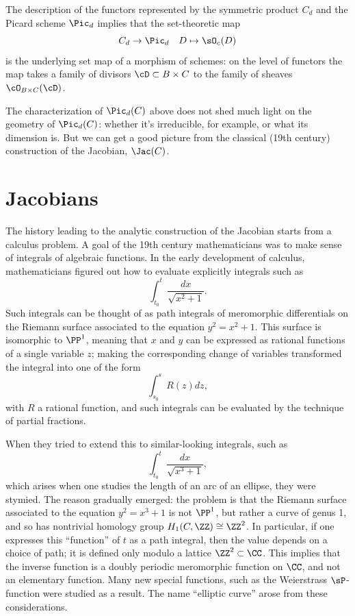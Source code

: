 The description of the functors represented by the symmetric product $C_d$ and the Picard scheme $\Pic_d$ implies that the 
set-theoretic map
$$
C_d \to \Pic_d \quad D \mapsto \sO_c(D)
$$
is the underlying set map of a morphism of schemes: on the level of functors the map takes a family of divisors $\cD\subset B\times C$
to the family of sheaves $\cO_{B\times C}(\cD)$.

The characterization of $\Pic_d(C)$ above does not shed much light on the geometry of $\Pic_d(C)$: whether it's irreducible, for example, or what its dimension is. But we can get a  good picture from the classical (19th century) construction of the Jacobian, $\Jac(C)$.
 
\section{Jacobians}

The history leading to the analytic construction of the Jacobian starts from a calculus problem. A goal of the 19th century mathematicians was  to make sense of integrals of algebraic functions. In the early development of calculus, mathematicians figured out how to evaluate explicitly integrals such as
$$
\int_{t_0}^t \frac{dx}{\sqrt{x^2+1}}.
$$
Such integrals can be thought of as path integrals of meromorphic differentials on the Riemann surface associated to the equation $y^2 = x^2+1$. This surface is isomorphic to $\PP^1$, meaning that $x$ and $y$ can be expressed as rational functions of a single variable $z$; making the corresponding change of variables transformed the integral into one of the form
$$
\int_{s_0}^s R(z)dz,
$$
with $R$ a rational function, and such integrals can be evaluated by the technique of partial fractions.

When they tried to extend this to similar-looking integrals, such as
$$
\int_{t_0}^t \frac{dx}{\sqrt{x^3+1}},
$$
which arises when one studies the length of an arc of an ellipse, they were stymied. The reason gradually emerged: the problem is that the Riemann surface associated to the equation $y^2 = x^3+1$ is not $\PP^1$, but rather a curve of genus 1, and so has nontrivial homology group $H_1(C, \ZZ) \cong \ZZ^2$. In particular, if one expresses this ``function'' of $t$  as a path integral, then the value depends on a choice of path; it is defined only modulo a lattice $\ZZ^2 \subset \CC$. This implies that the inverse function is a doubly periodic meromorphic function on $\CC$, and not an elementary function. Many new special functions, such as the Weierstrass $\sP$-function were studied as a result. The name ``elliptic curve'' arose from these considerations.

